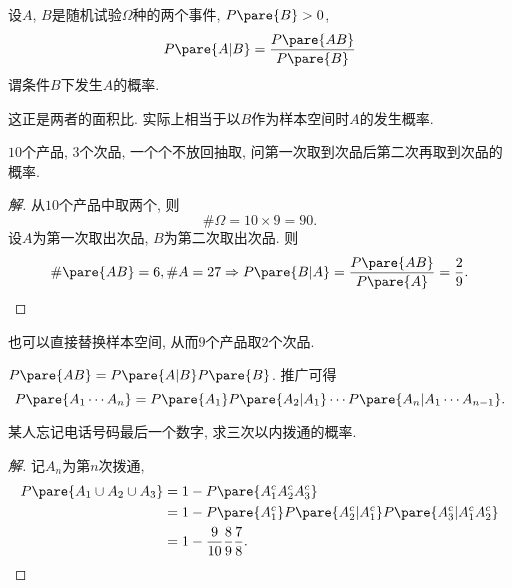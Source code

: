 \documentclass[../Statistics.tex]{subfiles}
\begin{document}
\begin{definition}[条件概率]
    设$A$, $B$是随机试验$\Omega$种的两个事件, $P\pare{B} > 0$,
    \[ P\pare{A\vert B} = \frac{P\pare{AB}}{P\pare{B}} \]
    谓条件$B$下发生$A$的概率.
\end{definition}
\begin{remark}
    这正是两者的面积比. 实际上相当于以$B$作为样本空间时$A$的发生概率.
\end{remark}
\begin{sample}
    \begin{ex}
        $10$个产品, $3$个次品, 一个个不放回抽取, 问第一次取到次品后第二次再取到次品的概率.
    \end{ex}
    \begin{proof}[解]
        从$10$个产品中取两个, 则
        \[ \#\Omega = 10\times 9 = 90. \]
        设$A$为第一次取出次品, $B$为第二次取出次品. 则
        \[ \#\pare{AB} = 6, \#A = 27\Rightarrow P\pare{B\vert A} = \frac{P\pare{AB}}{P\pare{A}} = \frac{2}{9}. \qedhere \]
    \end{proof}
    \begin{remark}
        也可以直接替换样本空间, 从而$9$个产品取$2$个次品.
    \end{remark}
\end{sample}
\begin{finale}
    \begin{theorem}[乘法定理]
        $P\pare{AB} = P\pare{A\vert B}P\pare{B}$. 推广可得
        \[ P\pare{A_1\cdots A_n} = P\pare{A_1}P\pare{A_2\vert A_1}\cdots P\pare{A_n\vert A_1\cdots A_{n-1}}. \]
    \end{theorem}
\end{finale}
\begin{sample}
    \begin{ex}
        某人忘记电话号码最后一个数字, 求三次以内拨通的概率.
    \end{ex}
    \begin{proof}[解]
        记$A_n$为第$n$次拨通,
        \begin{align*}
            P\pare{A_1 \cup A_2 \cup A_3} &= 1-P\pare{A_1^c A_2^c A_3^c}\\ &= 1 - P\pare{A_1^c}P\pare{A_2^c\vert A_1^c}P\pare{A_3^c\vert A_1^cA_2^c}\\ &= 1 - \frac{9}{10}\frac{8}{9}\frac{7}{8}. \qedhere
        \end{align*}
    \end{proof}
\end{sample}
\end{document}
